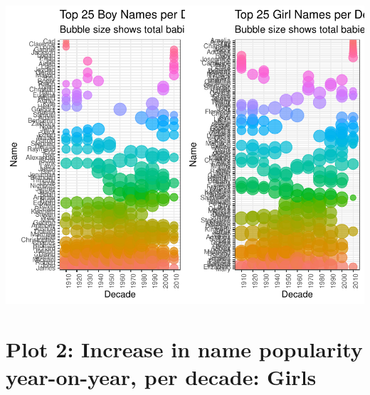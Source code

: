 \documentclass[11pt,preprint]{elsarticle}
\numberwithin{equation}{section}
\numberwithin{figure}{section}
\numberwithin{table}{section}
\begin{document}
\begin{center}\includegraphics{Question1_files/figure-latex/unnamed-chunk-1-1} \end{center}
\newpage

\section{Plot 2: Increase in name popularity year-on-year, per decade:
Girls}\label{plot-2-increase-in-name-popularity-year-on-year-per-decade-girls}
\end{document}

